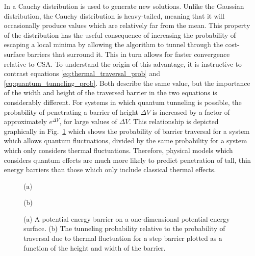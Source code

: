 \documentclass[11pt]{afthesis}
\begin{document}
	In \cite{szu1987fastsimulatedannealing} a Cauchy distribution is used to generate new solutions. Unlike the Gaussian distribution, the Cauchy distribution is heavy-tailed, meaning that it will occasionally produce values which are relatively far from the mean. This property of the distribution has the useful consequence of increasing the probability of escaping a local minima by allowing the algorithm to tunnel through the cost-surface barriers that surround it. This in turn allows for faster convergence relative to CSA. To understand the origin of this advantage, it is instructive to contrast equations \ref{eq:thermal_traversal_prob} and \ref{eq:quantum_tunneling_prob}. Both describe the same value, but the importance of the width and height of the traversed barrier in the two equations is considerably different. For systems in which quantum tunneling is possible, the probability of penetrating a barrier of height \begin{math} \Delta V \end{math} is increased by a factor of approximately \begin{math} e^{\Delta V} \end{math}, for large values of \begin{math} \Delta V \end{math}. This relationship is depicted graphically in Fig.~\ref{fig:quantum_advantage} which shows the probability of barrier traversal for a system which allows quantum fluctuations, divided by the same probability for a system which only considers thermal fluctuations. Therefore, physical models which considers quantum effects are much more likely to predict penetration of tall, thin energy barriers than those which only include classical thermal effects. 
	
	\begin{figure}[ht!]
		
		\begin{minipage}[b]{0.48\linewidth}
			\centering
			\centerline{}
			\centerline{(a)}\medskip
		\end{minipage}
		\hfill
		\begin{minipage}[b]{0.48\linewidth}
			\centering
			\centerline{}
			\centerline{(b)}\medskip
		\end{minipage}
		\caption{
			(a) A potential energy barrier on a one-dimensional potential energy surface.
			(b) The tunneling probability relative to the probability of traversal due to thermal fluctuation for a step barrier plotted as a function of the height and width of the barrier.}
		\label{fig:quantum_advantage}
	\end{figure}
		
\end{document}
